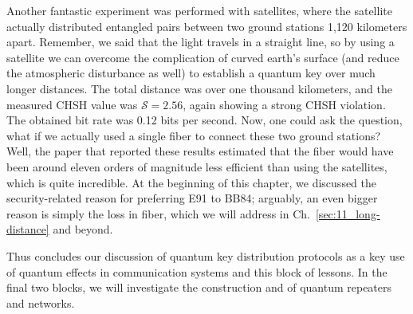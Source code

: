 Another fantastic experiment was performed with satellites, where the satellite actually distributed entangled pairs between two ground stations 1,120 kilometers apart. Remember, we said that the light travels in a straight line, so by using a satellite we can overcome the complication of curved earth's surface (and reduce the atmospheric disturbance as well) to establish a quantum key over much longer distances. The total distance was over one thousand kilometers, and the measured CHSH value was $\mathcal{S} = 2.56$, again showing a strong CHSH violation. The obtained bit rate was 0.12 bits per second. Now, one could ask the question, what if we actually used a single fiber to connect these two ground stations? Well, the paper that reported these results estimated that the fiber would have been around eleven orders of magnitude less efficient than using the satellites, which is quite incredible.  At the beginning of this chapter, we discussed the security-related reason for preferring E91 to BB84; arguably, an even bigger reason is simply the loss in fiber, which we will address in Ch.~\ref{sec:11_long-distance} and beyond.

Thus concludes our discussion of quantum key distribution protocols as a key use of quantum effects in communication systems and this block of lessons. In the final two blocks, we will investigate the construction and of quantum repeaters and networks.

